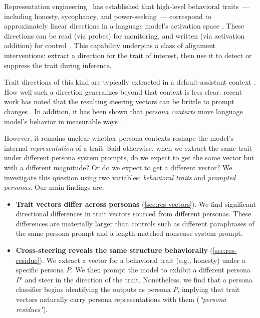 \documentclass{article}
\theoremstyle{plain}
\theoremstyle{definition}
\theoremstyle{remark}
\begin{document}
Representation engineering~\citep{zou2023representation} has established that high-level behavioral traits~--- including honesty, sycophancy, and power-seeking~--- correspond to approximately linear directions in a language model's activation space \citep{park2024linear, marks2024geometry, burns2024discoveringlatentknowledgelanguage}. These directions can be read (via probes) for monitoring, and written (via activation addition) for control~\citep{turner2024activation, rimsky2024steering, subramani-etal-2022-extracting}. This capability underpins a class of alignment interventions: extract a direction for the trait of interest, then use it to detect or suppress the trait during inference.

Trait directions of this kind are typically extracted in a default-assistant context \citep{zou2023representation, goldowskydill2025detectingstrategicdeceptionusing, chen2025persona}. How well such a direction generalizes beyond that context is less clear: recent work has noted that the resulting steering vectors can be brittle to prompt changes \citep{tan2024analysing, braun2025understanding}. In addition, it has been shown that \textit{persona contexts} move language model's behavior in measurable ways \citep{shanahan_role_2023, chen2025persona, lu2026assistant}.

However, it remains unclear whether persona contexts reshape the model's internal \textit{representation} of a trait. Said otherwise, when we extract the same trait under different persona system prompts, do we expect to get the same vector but with a different magnitude? Or do we expect to get a different vector? 
We investigate this question using two variables: \textit{behavioral traits} and \textit{prompted personas}.
Our main findings are:
\begin{itemize}

    \item \textbf{Trait vectors differ across personas} (\cref{sec:res-vectors}). We find significant directional differences in trait vectors sourced from different personas. These differences are materially larger than controls such as different paraphrases of the same persona prompt and a length-matched nonsense system prompt. 
    \item \textbf{Cross-steering reveals the same structure behaviorally} (\cref{sec:res-residue}). We extract a vector for a behavioral trait (e.g., honesty) under a specific persona $P$. We then prompt the model to exhibit a different persona $P'$ and steer in the direction of the trait. Nonetheless, we find that a persona classifier begins identifying the outputs as persona $P$, implying that trait vectors naturally carry persona representations with them (\textit{``persona residues"}).


\end{itemize}
 
\end{document}
